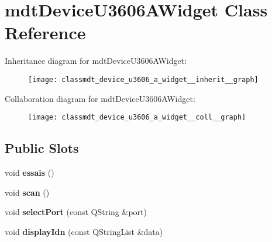 \hypertarget{classmdt_device_u3606_a_widget}{
\section{mdtDeviceU3606AWidget Class Reference}
\label{classmdt_device_u3606_a_widget}
}


Inheritance diagram for mdtDeviceU3606AWidget:\nopagebreak
\begin{figure}[H]
\begin{center}
\leavevmode
\texttt{[image: classmdt\_device\_u3606\_a\_widget\_\_inherit\_\_graph]}
\end{center}
\end{figure}


Collaboration diagram for mdtDeviceU3606AWidget:\nopagebreak
\begin{figure}[H]
\begin{center}
\leavevmode
\texttt{[image: classmdt\_device\_u3606\_a\_widget\_\_coll\_\_graph]}
\end{center}
\end{figure}
\subsection*{Public Slots}
\begin{DoxyCompactItemize}
\item 
\hypertarget{classmdt_device_u3606_a_widget_aa232cf25e8ac0dee00cde5089af623b0}{
void {\bfseries essais} ()}
\label{classmdt_device_u3606_a_widget_aa232cf25e8ac0dee00cde5089af623b0}

\item 
\hypertarget{classmdt_device_u3606_a_widget_abc2b2860e71a9c79af6697205ead2a84}{
void {\bfseries scan} ()}
\label{classmdt_device_u3606_a_widget_abc2b2860e71a9c79af6697205ead2a84}

\item 
\hypertarget{classmdt_device_u3606_a_widget_a15409aed9aa73929b64be63db9f31f8e}{
void {\bfseries selectPort} (const QString \&port)}
\label{classmdt_device_u3606_a_widget_a15409aed9aa73929b64be63db9f31f8e}

\item 
\hypertarget{classmdt_device_u3606_a_widget_a3e979d85d5e198a97b36b4956d06ce8e}{
void {\bfseries displayIdn} (const QStringList \&data)}
\label{classmdt_device_u3606_a_widget_a3e979d85d5e198a97b36b4956d06ce8e}

\end{DoxyCompactItemize}
